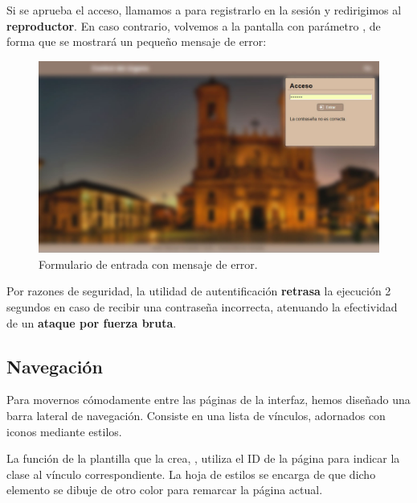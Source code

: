 Si se aprueba el acceso, llamamos a  para registrarlo en la sesión y redirigimos al \textbf{reproductor}. En caso contrario, volvemos a la pantalla con parámetro , de forma que se mostrará un pequeño mensaje de error:

\smallskip

\begin{figure}[H]
	\noindent \begin{centering}
		\includegraphics[width=\linewidth*3/4]{capitulo5/cap_login_error}
		\par\end{centering}
	\smallskip
	\caption{\label{fig:cap_login_error} Formulario de entrada con mensaje de error.}
\end{figure} 

\smallskip

Por razones de seguridad, la utilidad de autentificación \textbf{retrasa} la ejecución 2 segundos en caso de recibir una contraseña incorrecta, atenuando la efectividad de un \textbf{ataque por fuerza bruta}.

\subsection{Navegación}

Para movernos cómodamente entre las páginas de la interfaz, hemos diseñado una barra lateral de navegación. Consiste en una lista de vínculos, adornados con iconos mediante estilos. 

La función de la plantilla que la crea, , utiliza el ID de la página para indicar la clase  al vínculo correspondiente. La hoja de estilos se encarga de que dicho elemento se dibuje de otro color para remarcar la página actual.

